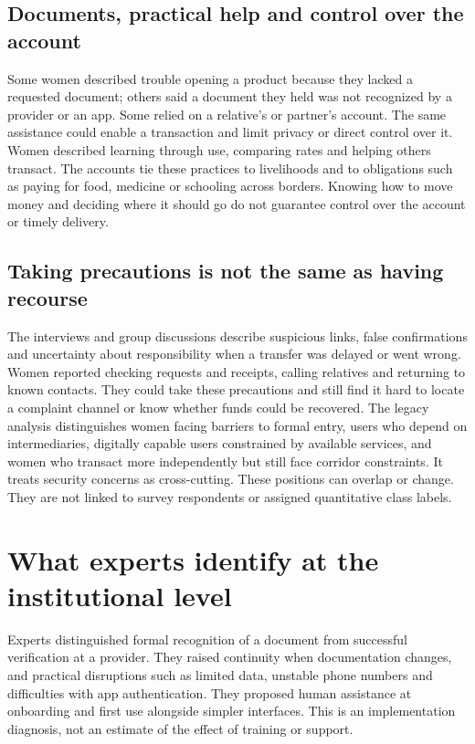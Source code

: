 \documentclass[12pt]{article}
\begin{document}
\subsection{Documents, practical help and control over the account}

Some women described trouble opening a product because they lacked a requested document; others said a document they held was not recognized by a provider or an app. Some relied on a relative's or partner's account. The same assistance could enable a transaction and limit privacy or direct control over it. Women described learning through use, comparing rates and helping others transact. The accounts tie these practices to livelihoods and to obligations such as paying for food, medicine or schooling across borders. Knowing how to move money and deciding where it should go do not guarantee control over the account or timely delivery.

\subsection{Taking precautions is not the same as having recourse}

The interviews and group discussions describe suspicious links, false confirmations and uncertainty about responsibility when a transfer was delayed or went wrong. Women reported checking requests and receipts, calling relatives and returning to known contacts. They could take these precautions and still find it hard to locate a complaint channel or know whether funds could be recovered. The legacy analysis distinguishes women facing barriers to formal entry, users who depend on intermediaries, digitally capable users constrained by available services, and women who transact more independently but still face corridor constraints. It treats security concerns as cross-cutting. These positions can overlap or change. They are not linked to survey respondents or assigned quantitative class labels.

\section{What experts identify at the institutional level}
Experts distinguished formal recognition of a document from successful verification at a provider. They raised continuity when documentation changes, and practical disruptions such as limited data, unstable phone numbers and difficulties with app authentication. They proposed human assistance at onboarding and first use alongside simpler interfaces. This is an implementation diagnosis, not an estimate of the effect of training or support.
\end{document}
